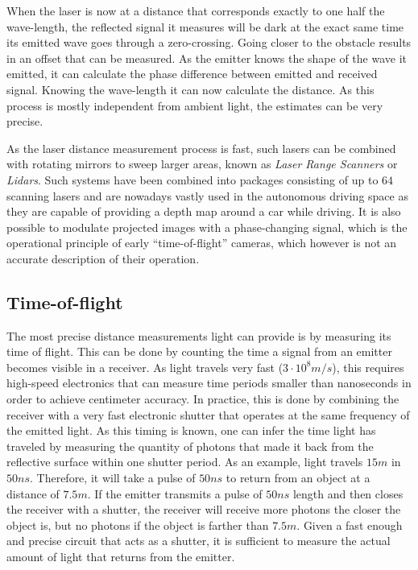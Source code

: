 When the laser is now at a distance that corresponds exactly to one half the wave-length, the reflected signal it measures will be dark at the exact same time its emitted wave goes through a zero-crossing. Going closer to the obstacle results in an offset that can be measured. As the emitter knows the shape of the wave it emitted, it can calculate the phase difference between emitted and received signal. Knowing the wave-length it can now calculate the distance. As this process is mostly independent from ambient light, the estimates can be very precise.

As the laser distance measurement process is fast, such lasers can be combined with rotating mirrors to sweep larger areas, known as \textsl{Laser Range Scanners} or \textsl{Lidars}. Such systems have been combined into packages consisting of up to $64$ scanning lasers and are nowadays vastly used in the autonomous driving space as they are capable of providing a depth map around a car while driving.
It is also possible to modulate projected images with a phase-changing signal, which is the operational principle of early ``time-of-flight'' cameras, which however is not an accurate description of their operation.

\subsection{Time-of-flight}

The most precise distance measurements light can provide is by measuring its time of flight. This can be done by counting the time a signal from an emitter becomes visible in a receiver. As light travels very fast ($3\cdot10^8m/s$), this requires high-speed electronics that can measure time periods smaller than nanoseconds in order to achieve centimeter accuracy.
In practice, this is done by combining the receiver with a very fast electronic shutter that operates at the same frequency of the emitted light. As this timing is known, one can infer the time light has traveled by measuring the quantity of photons that made it back from the reflective surface within one shutter period.
As an example, light travels $15m$ in $50ns$. Therefore, it will take a pulse of $50ns$ to return from an object at a distance of $7.5m$. If the emitter transmits a pulse of $50ns$ length and then closes the receiver with a shutter, the receiver will receive more photons the closer the object is, but no photons if the object is farther than $7.5m$. Given a fast enough and precise circuit that acts as a shutter, it is sufficient to measure the actual amount of light that returns from the emitter.

